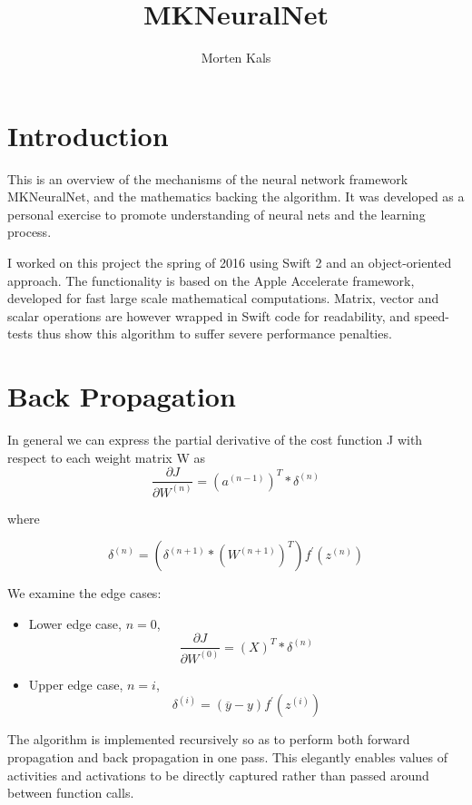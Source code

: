 \documentclass[11pt]{article}
\begin{document}
\title{MKNeuralNet}
\author{Morten Kals}
\maketitle

\section{Introduction}
This is an overview of the mechanisms of the neural network framework MKNeuralNet, and the mathematics backing the algorithm. It was developed as a personal exercise to promote understanding of neural nets and the learning process. 

I worked on this project the spring of 2016 using Swift 2 and an object-oriented approach. The functionality is based on the Apple Accelerate framework, developed for fast large scale mathematical computations. Matrix, vector and scalar operations are however wrapped in Swift code for readability, and speed-tests thus show this algorithm to suffer severe performance penalties. 

\section{Back Propagation}

In general we can express the partial derivative of the cost function J with respect to each weight matrix W as
\[ 
\frac{\partial J }{\partial W^{(n)}} = \left ( a^{(n-1)} \right ) ^T * \delta ^{(n)} 
\]

where 

\[
\delta ^{(n)} = \left( \delta ^{(n+1)} * \left(W^{(n+1)}\right) ^T \right ) f^\prime (z^{(n)})
\]

We examine the edge cases: 

\begin{itemize}

	\item Lower edge case, $ n = 0 $, 
\[
\frac{\partial J }{\partial W^{(0)}} = \left( X \right) ^T * \delta ^{(n)} 
\]

	\item Upper edge case, $ n = i $, 
\[
\delta ^{(i)} = (\overline y - y ) f^\prime (z^{(i)})
\]

\end{itemize}


The algorithm is implemented recursively so as to perform both forward propagation and back propagation in one pass. This elegantly enables values of activities and activations to be directly captured rather than passed around between function calls. \\
\end{document}
